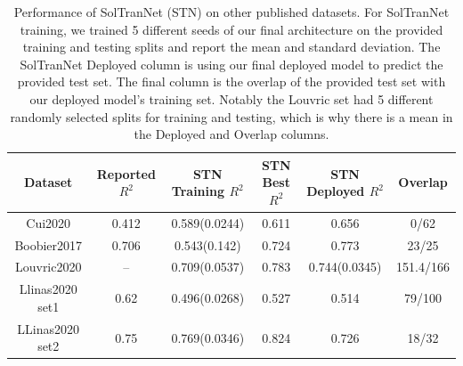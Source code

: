 \documentclass[journal=jcisd8,manuscript=article]{achemso}
\begin{document}
\begin{table}
    \begin{tabular}{|c|c|c|c|c|c|}
        \hline
         Dataset & Reported $R^2$ & STN Training $R^2$ &  STN Best $R^2$ & STN Deployed $R^2$ & Overlap \\
        \hline
         Cui2020 & 0.412 & 0.589(0.0244) & 0.611 &  0.656 & 0/62 \\
        Boobier2017 & 0.706 &  0.543(0.142) & 0.724 &  0.773 & 23/25 \\
        Louvric2020 &  -- & 0.709(0.0537) & 0.783 & 0.744(0.0345) & 151.4/166 \\
        Llinas2020 set1 & 0.62 & 0.496(0.0268) &  0.527 & 0.514 & 79/100 \\
        LLinas2020 set2 & 0.75 & 0.769(0.0346) & 0.824 & 0.726 & 18/32 \\
        \hline
    \end{tabular}
    \caption{Performance of SolTranNet (STN) on other published datasets. For SolTranNet training, we trained 5 different seeds of our final architecture on the provided training and testing splits and report the mean and standard deviation. The SolTranNet Deployed column is using our final deployed model to predict the provided test set. The final column is the overlap of the provided test set with our deployed model's training set. Notably the Louvric set had 5 different randomly selected splits for training and testing, which is why there is a mean in the Deployed and Overlap columns.}
    \label{tab:othersetsr2}
\end{table}
\end{document}
